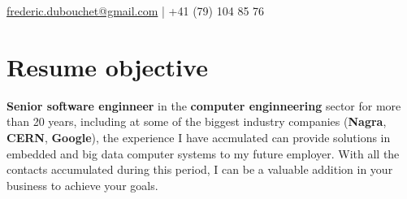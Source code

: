 \documentclass[a4paper]{deedy-resume} %
\begin{document}
\lastupdated


	{\href{mailto:frederic.dubouchet@gmail.com}{frederic.dubouchet@gmail.com} | +41 (79) 104 85 76}

\section{Resume objective}

\begin{flushleft}
	\textbf{Senior software enginneer} in the \textbf{computer enginneering}
	sector for more than 20 years, including at some of the biggest industry 
	companies (\textbf{Nagra}, \textbf{CERN}, \textbf{Google}), the 
	experience I have accmulated can provide solutions in embedded and big data
	computer systems to my future employer. With all the contacts accumulated
	during this period, I can be a valuable addition in your business to 
	achieve	your goals.
\end{flushleft}


\noindent\makebox[\linewidth]{\color{headings}\rule{\paperwidth}{0.4pt}}

\end{document}
